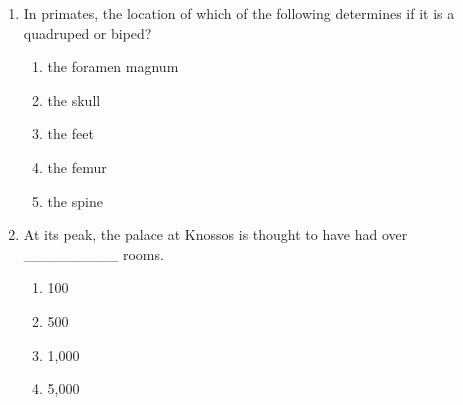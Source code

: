 \documentclass[12pt]{article}
\begin{document}
\begin{enumerate}[label=\arabic*.]
\begin{enumerate}[label=(\alph*)]
    \item primarily C$_{4}$ plants that included corn and potatoes.
\end{enumerate}
\item In primates, the location of which of the following determines if it is a quadruped or biped?
\begin{enumerate}[label=(\alph*)]
    \item the foramen magnum
    \item the skull
    \item the feet
    \item the femur
    \item the spine
\end{enumerate}
\item At its peak, the palace at Knossos is thought to have had over \_\_\_\_\_\_\_\_\_ rooms.
\begin{enumerate}[label=(\alph*)]
    \item 100
    \item 500
    \item 1,000
    \item 5,000
\end{enumerate}
\end{enumerate}
\end{document}
